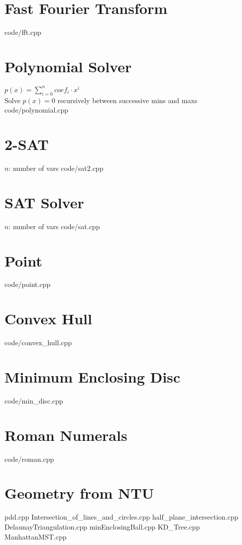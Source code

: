 \documentclass [landscape,8pt,a4paper,twocolumn]{article}
\begin{document}
\section{Fast Fourier Transform}
 {code/fft.cpp}

\vfill\null

\section{Polynomial Solver}
$ p(x)=\sum_{i=0}^{n} coef_i \cdot x^i $ \\
Solve $ p(x)=0 $ recursively between successive mins and maxs
 {code/polynomial.cpp}

\vfill\null

\section{2-SAT}
$ n $: number of vars
 {code/sat2.cpp}

\section{SAT Solver}
$ n $: number of vars
 {code/sat.cpp}

\section{Point}
 {code/point.cpp}

\section{Convex Hull}
 {code/convex_hull.cpp}

\section{Minimum Enclosing Disc}
 {code/min_disc.cpp}

\section{Roman Numerals}
 {code/roman.cpp}

\section{Geometry from NTU}
 {pdd.cpp}
 {Intersection_of_lines_and_circles.cpp}
 {half_plane_intersection.cpp}
 {DelaunayTriangulation.cpp}
 {minEnclosingBall.cpp}
 {KD_Tree.cpp}
 {ManhattanMST.cpp}
\end{document}
